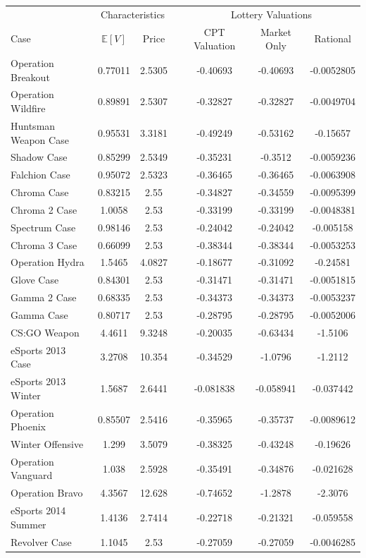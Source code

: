 \documentclass[12pt]{paper}
\begin{document}
\begin{minipage}{\linewidth}
  \centering
  \begin{tabular}{@{}lcccccc@{}}\toprule
    & \multicolumn{2}{c}{Characteristics} & &\multicolumn{3}{c}{Lottery Valuations}\\
    \cmidrule{2-3} \cmidrule{5-7}
  Case & $\mathbb{E}[V]$ & Price &\quad& CPT Valuation & Market Only & Rational\\\midrule
Operation Breakout & 0.77011 & 2.5305 &\quad& -0.40693 & -0.40693 & -0.0052805\\
Operation Wildfire & 0.89891 & 2.5307 &\quad& -0.32827 & -0.32827 & -0.0049704\\
Huntsman Weapon Case & 0.95531 & 3.3181 &\quad& -0.49249 & -0.53162 & -0.15657\\
Shadow Case & 0.85299 & 2.5349 &\quad& -0.35231 & -0.3512 & -0.0059236\\
Falchion Case & 0.95072 & 2.5323 &\quad& -0.36465 & -0.36465 & -0.0063908\\
Chroma Case & 0.83215 & 2.55 &\quad& -0.34827 & -0.34559 & -0.0095399\\
Chroma 2 Case & 1.0058 & 2.53 &\quad& -0.33199 & -0.33199 & -0.0048381\\
Spectrum Case & 0.98146 & 2.53 &\quad& -0.24042 & -0.24042 & -0.005158\\
Chroma 3 Case & 0.66099 & 2.53 &\quad& -0.38344 & -0.38344 & -0.0053253\\
Operation Hydra & 1.5465 & 4.0827 &\quad& -0.18677 & -0.31092 & -0.24581\\
Glove Case & 0.84301 & 2.53 &\quad& -0.31471 & -0.31471 & -0.0051815\\
Gamma 2 Case & 0.68335 & 2.53 &\quad& -0.34373 & -0.34373 & -0.0053237\\
Gamma Case & 0.80717 & 2.53 &\quad& -0.28795 & -0.28795 & -0.0052006\\
CS:GO Weapon & 4.4611 & 9.3248 &\quad& -0.20035 & -0.63434 & -1.5106\\
eSports 2013 Case & 3.2708 & 10.354 &\quad& -0.34529 & -1.0796 & -1.2112\\
eSports 2013 Winter & 1.5687 & 2.6441 &\quad& -0.081838 & -0.058941 & -0.037442\\
Operation Phoenix & 0.85507 & 2.5416 &\quad& -0.35965 & -0.35737 & -0.0089612\\
Winter Offensive & 1.299 & 3.5079 &\quad& -0.38325 & -0.43248 & -0.19626\\
Operation Vanguard & 1.038 & 2.5928 &\quad& -0.35491 & -0.34876 & -0.021628\\
Operation Bravo & 4.3567 & 12.628 &\quad& -0.74652 & -1.2878 & -2.3076\\
eSports 2014 Summer & 1.4136 & 2.7414 &\quad& -0.22718 & -0.21321 & -0.059558\\
Revolver Case & 1.1045 & 2.53 &\quad& -0.27059 & -0.27059 & -0.0046285\\\bottomrule
  \end{tabular}
  
\end{minipage}
\vspace{.2in}
\end{document}
